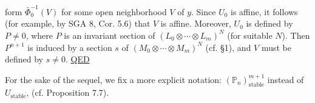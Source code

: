 
form $\bar{\Phi}_0^{-1}(V)$ for some open neighborhood $V$ of $y$. Since $U_0$ is affine, it follows (for example, by SGA 8, Cor. 5.6) that $V$ is affine. Moreover, $U_0$ is defined by $P\ne0$, where $P$ is an invariant section of $(L_0\otimes\cdots\otimes L_m)^N$ (for suitable $N$). Then $P^{n+1}$ is induced by a section $s$ of $(M_0\otimes\cdots\otimes M_m)^N$ (cf. \S1), and $V$ must be defined by $s\ne0$. \uline{QED}

For the sake of the sequel, we fix a more explicit notation:
$(\mathbb{P}_n)_{\mathrm{stable}}^{m+1}$ instead of $U_{\mathrm{stable}}$, (cf. Proposition 7.7).
